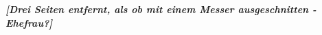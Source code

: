 
\begin{center}
  {\helvetica\itshape\bfseries\fontsize{36}{20} \color{red} [Drei Seiten entfernt, als ob mit einem Messer ausgeschnitten - Ehefrau?] }
\end{center}

\clearpage
